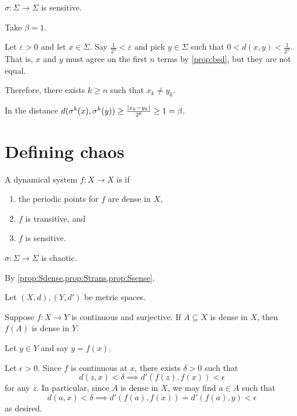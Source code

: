 \documentclass[class=pmath370,tikz,notes]{agony}
\begin{document}
\begin{prop}\label{prop:Ssense}
  $\sigma : \Sigma \to \Sigma$ is sensitive.
\end{prop}
\begin{prf}
  Take $\beta = 1$.

  Let $\varepsilon > 0$ and let $x \in \Sigma$.
  Say $\frac1{2^n} < \varepsilon$ and pick $y \in \Sigma$
  such that $0 < d(x,y) < \frac1{2^n}$.
  That is, $x$ and $y$ must agree on the first $n$ terms by \cref{prop:bsd},
  but they are not equal.

  Therefore, there exists $k \geq n$ such that $x_k \neq y_k$.

  In the distance $d(\sigma^k(x),\sigma^k(y)) \geq \frac{\abs{x_k-y_k}}{2^0} \geq 1 = \beta$.
\end{prf}

\section{Defining chaos}

\begin{defn}[chaos]
  A dynamical system $f: X \to X$ is  if
  \begin{enumerate}[nosep]
    \item the periodic points for $f$ are dense in $X$,
    \item $f$ is transitive, and
    \item $f$ is sensitive.
  \end{enumerate}
\end{defn}

\begin{theorem}
  $\sigma: \Sigma \to \Sigma$ is chaotic.
\end{theorem}
\begin{prf}
  By \cref{prop:Sdense,prop:Strans,prop:Ssense}.
\end{prf}

\begin{prop}\label{prop:dense}
  Let $(X, d), (Y, d')$ be metric spaces.

  Suppose $f: X \to Y$ is continuous and surjective.
  If $A \subseteq X$ is dense in $X$, then $f(A)$ is dense in $Y$.
\end{prop}
\begin{prf}
  Let $y \in Y$ and say $y = f(x)$.

  Let $\epsilon > 0$.
  Since $f$ is continuous at $x$, there exists $\delta > 0$ such that
  \[ d(z, x) < \delta \implies d'(f(z), f(x)) < \epsilon \]
  for any $z$. In particular, since $A$ is dense in $X$, we may find $a \in A$ such that
  \[ d(a, x) < \delta \implies d'(f(a), f(x)) = d'(f(a), y) < \epsilon \]
  as desired.
\end{prf}
\end{document}
